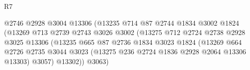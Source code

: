\begin{lexlean}{R7}
\begin{coremodule}
                                          @2746
                                          @2928
                                          @3004
                                          @13306
                                          (@13235
                                            @714
                                            @87
                                            @2744
                                            @1834
                                            @3002
                                            @1824
                                            (@13269
                                              @713
                                              @2739
                                              @2743
                                              @3026
                                              @3002
                                              (@13275
                                                @712
                                                @2724
                                                @2738
                                                @2928
                                                @3025
                                                @13306
                                                (@13235
                                                  @665
                                                  @87
                                                  @2736
                                                  @1834
                                                  @3023
                                                  @1824
                                                  (@13269
                                                    @664
                                                    @2726
                                                    @2735
                                                    @3044
                                                    @3023
                                                    (@13275
                                                      @236
                                                      @2724
                                                      @1836
                                                      @2928
                                                      @2064
                                                      @13306
                                                      @13303)
                                                    @3057)
                                                  @13302))
                                              @3063)

\end{coremodule}
\end{lexlean}
